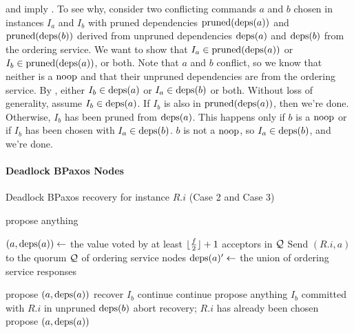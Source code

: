  and  imply
. To see why, consider two conflicting commands $a$
and $b$ chosen in instances $I_a$ and $I_b$ with pruned dependencies
$\text{pruned}(\text{deps}(a))$ and $\text{pruned}(\text{deps}(b))$ derived from unpruned dependencies
$\text{deps}(a)$ and $\text{deps}(b)$ from the ordering service. We want to show that $I_a
\in \text{pruned}(\text{deps}(a))$ or $I_b \in \text{pruned}(\text{deps}(a))$, or both. Note that $a$
and $b$ conflict, so we know that neither is a $\text{noop}$ and that their unpruned
dependencies are from the ordering service.
%
By , either $I_b \in \text{deps}(a)$ or $I_a \in \text{deps}(b)$ or
both. Without loss of generality, assume $I_b \in \text{deps}(a)$. If $I_b$ is also
in $\text{pruned}(\text{deps}(a))$, then we're done. Otherwise, $I_b$ has been pruned from
$\text{deps}(a)$. This happens only if $b$ is a $\text{noop}$ or if $I_b$ has been chosen
with $I_a \in \text{deps}(b)$. $b$ is not a $\text{noop}$, so $I_a \in \text{deps}(b)$, and we're
done.

\paragraph{Deadlock BPaxos Nodes}
\begin{algorithm}[ht]
  \caption{Deadlock BPaxos recovery for instance $R.i$ (Case 2 and Case 3)}%
  \begin{algorithmic}[1]
      \State{} propose anything
    \EndIf{}

    \State{}
    \State{} $(a, \text{deps}(a)) \gets$ the value voted by at least
             $\lfloor\frac{f}{2}\rfloor + 1$ acceptors in $\mathcal{Q}$
    \State{} Send $(R.i, a)$ to the quorum $\mathcal{Q}$ of ordering service nodes
    \State{} $\text{deps}(a)' \gets$ the union of ordering service responses

    \State{}
      \State{} propose $(a, \text{deps}(a))$
    \EndIf{}
        \State{} recover $I_b$
      \EndIf
        \State{} continue
      \EndIf{}
        \State{} continue
        \State{} propose anything
      \Else{}
        \State{} $I_b$ committed with $R.i$ in unpruned $\text{deps}(b)$
        \State{} abort recovery; $R.i$ has already been chosen
      \EndIf{}
    \EndFor{}
    \State{} propose $(a, \text{deps}(a))$
  \end{algorithmic}
\end{algorithm}


